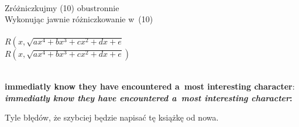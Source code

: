 \documentclass[a4paper,11pt]{article}
\begin{document}
\noi
{} \\
\Jest Zróżniczkujmy (10) obustronnie \\
\Powin  Wykonując jawnie różniczkowanie w~(10) \\
 \\
\Jest $R\left( x, \sqrt{ a x^{ 4 } + b x^{ 3 } + c x^{ 2 } + d x + e }
\right.$ \\
\Powin
$R\left( x, \sqrt{ a x^{ 4 } + b x^{ 3 } + c x^{ 2 } + d x + e }
\right)$ \\

\vspace{\spaceTwo}







\noi
{} \\
\Jest \textbf{immediatly know they have encountered a~most interesting
  character}: \\
\Powin \textbf{\emph{immediatly know they have encountered a~most
    interesting
    character}:} \\

\vspace{\spaceTwo}







 \start Tyle błędów, że szybciej będzie napisać tę
książkę od nowa.

\vspace{\spaceFour}
\end{document}
